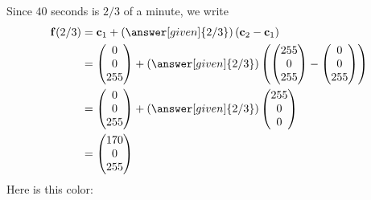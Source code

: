 \documentclass{ximera}
\begin{document}
\begin{example}
\begin{explanation}
\[    \]
    Since $40$ seconds is $2/3$ of a minute, we write
    \begin{align*}
      \vec{f}(2/3) &= \vec{c}_{1}+ \left(\answer[given]{2/3}\right)(\vec{c}_2 -\vec{c}_1) \\
      &= \begin{pmatrix}0\\0\\255\end{pmatrix}+ \left(\answer[given]{2/3}\right)\left(\begin{pmatrix}255\\0\\255\end{pmatrix}  -  \begin{pmatrix}0\\0\\255\end{pmatrix}\right) \\
      &=\begin{pmatrix}0\\0\\255\end{pmatrix}+ \left(\answer[given]{2/3}\right)\begin{pmatrix}255\\0\\0\end{pmatrix} \\
                &=\begin{pmatrix}170\\0\\255\end{pmatrix}
    \end{align*}
    Here is this color:
    \begin{center}
    \colorbox[RGB]{170,0, 255}{
      \parbox{1cm}{\rule{0pt}{1cm}}}
  \end{center}
  \end{explanation}
\end{example}
\end{document}
